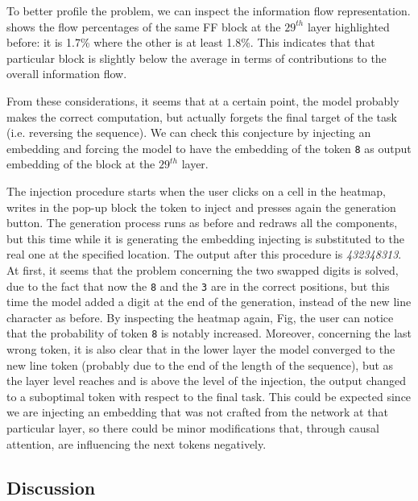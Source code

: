 {To better profile the problem, we can inspect the information flow representation.
shows the flow percentages of the same FF block at the $29^{th}$ layer highlighted before: it is 1.7\% where the other is at least 1.8\%.
This indicates that that particular block is slightly below the average in terms of contributions to the overall information flow.

From these considerations, it seems that at a certain point, the model probably makes the correct computation, but actually forgets the final target of the task (i.e. reversing the sequence).
We can check this conjecture by injecting an embedding and forcing the model to have the embedding of the token \texttt{8} as output embedding of the block at the $29^{th}$ layer.

The injection procedure starts when the user clicks on a cell in the heatmap, writes in the pop-up block the token to inject and presses again the generation button.
The generation process runs as before and redraws all the components, but this time while it is generating the embedding injecting is substituted to the real one at the specified location.
The output after this procedure is \emph{432348313}.
At first, it seems that the problem concerning the two swapped digits is solved, due to the fact that now the \texttt{8} and the \texttt{3} are in the correct positions, but this time the model added a digit at the end of the generation, instead of the new line character as before.
By inspecting the heatmap again, Fig, the user can notice that the probability of token \texttt{8} is notably increased.
Moreover, concerning the last wrong token, it is also clear that in the lower layer the model converged to the new line token (probably due to the end of the length of the sequence), but as the layer level reaches and is above the level of the injection, the output changed to a suboptimal token with respect to the final task.
This could be expected since we are injecting an embedding that was not crafted from the network at that particular layer, so there could be minor modifications that, through causal attention, are influencing the next tokens negatively.
}

\subsection{Discussion}


